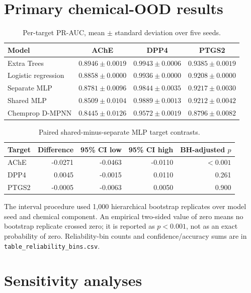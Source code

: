 \documentclass[11pt]{article}
\begin{document}
\section{Primary chemical-OOD results}

\begin{table}[ht]
\centering
\caption{Per-target PR-AUC, mean $\pm$ standard deviation over five seeds.}
\begin{tabular}{lccc}
\toprule
Model & AChE & DPP4 & PTGS2\\
\midrule
Extra Trees & $0.8946\pm0.0019$ & $0.9943\pm0.0006$ & $0.9385\pm0.0019$\\
Logistic regression & $0.8858\pm0.0000$ & $0.9936\pm0.0000$ & $0.9208\pm0.0000$\\
Separate MLP & $0.8781\pm0.0096$ & $0.9844\pm0.0035$ & $0.9217\pm0.0030$\\
Shared MLP & $0.8509\pm0.0104$ & $0.9889\pm0.0013$ & $0.9212\pm0.0042$\\
Chemprop D-MPNN & $0.8445\pm0.0126$ & $0.9572\pm0.0019$ & $0.8796\pm0.0082$\\
\bottomrule
\end{tabular}
\end{table}

\begin{table}[ht]
\centering
\caption{Paired shared-minus-separate MLP target contrasts.}
\begin{tabular}{lrrrr}
\toprule
Target & Difference & 95\% CI low & 95\% CI high & BH-adjusted $p$\\
\midrule
AChE & -0.0271 & -0.0463 & -0.0110 & $<0.001$\\
DPP4 & 0.0045 & -0.0015 & 0.0110 & 0.261\\
PTGS2 & -0.0005 & -0.0063 & 0.0050 & 0.900\\
\bottomrule
\end{tabular}
\end{table}

The interval procedure used 1,000 hierarchical bootstrap replicates over model
seed and chemical component. An empirical two-sided value of zero means no
bootstrap replicate crossed zero; it is reported as $p<0.001$, not as an exact
probability of zero. Reliability-bin counts and confidence/accuracy sums are in
\texttt{table\_reliability\_bins.csv}.

\section{Sensitivity analyses}
\end{document}
